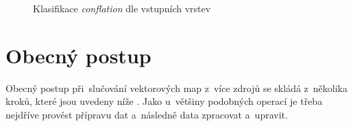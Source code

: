   \begin{figure}[H]
    \centering
      \small
      
      \caption{Klasifikace \textit{conflation} dle vstupních vrstev}
      \label{fig:classification}
  \end{figure}

\section{Obecný postup}
\label{postup}

Obecný postup při~slučování vektorových map z~více zdrojů se skládá z~několika
kroků, které jsou uvedeny níže \cite{wiemann,opensourceconflation}. Jako 
u~většiny podobných operací je třeba nejdříve provést přípravu dat a~následně 
data zpracovat a~upravit.

